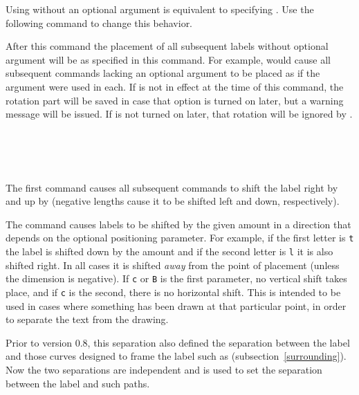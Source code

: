 \documentclass[letterpaper]{article}
\begin{document}
Using  without an optional argument is equivalent to
specifying . Use the following command to change this
behavior.

\begin{cd}
%
\end{cd}

After this command the placement of all subsequent labels without
optional argument will be as specified in this command. For example,
 would cause all subsequent 
commands lacking an optional argument to be placed as if the argument
 were used in each. If  is not in effect at the
time of this command, the rotation part will be saved in case that
option is turned on later, but a warning message will be issued. If
 is not turned on later, that rotation will be ignored by
.

\begin{cd}
\\
\\
\\
%
%
%
%
\end{cd}

The first command causes all subsequent  commands to shift
the label right by  and up by  (negative lengths
cause it to be shifted left and down, respectively).

The  command causes labels to be shifted by the given
amount in a direction that depends on the optional positioning
parameter. For example, if the first letter is \texttt{t} the label is
shifted down by the amount  and if the second letter is
\texttt{l} it is also shifted right. In all cases it is shifted
\emph{away} from the point of placement (unless the dimension is
negative). If \texttt{c} or \texttt{B} is the first parameter, no
vertical shift takes place, and if \texttt{c} is the second, there is no
horizontal shift. This is intended to be used in cases where something
has been drawn at that particular point, in order to separate the text
from the drawing.

Prior to version 0.8, this separation also defined the separation
between the label and those curves designed to frame the label
such as  (subsection~\ref{surrounding}). Now the two
separations are independent and  is used to set the
separation between the label and such paths.
\end{document}
